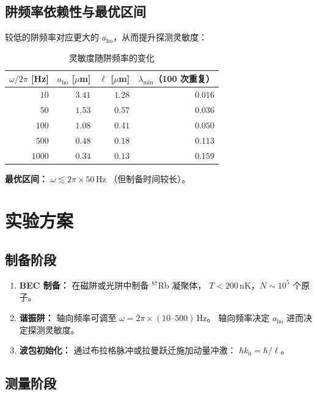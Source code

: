 \documentclass[a4paper,11pt]{article}
\begin{document}
\subsection{阱频率依赖性与最优区间}

较低的阱频率对应更大的 $a_{\mathrm{ho}}$，从而提升探测灵敏度：

\begin{table}[h]
\centering
\caption{灵敏度随阱频率的变化}
\begin{tabular}{rrrr}
\toprule
$\omega / 2\pi$ [Hz] & $a_{\mathrm{ho}}$ [$\mu$m] & $\ell$ [$\mu$m]
  & $\lambda_{\min}$（100 次重复） \\
\midrule
$10$   & $3{.}41$ & $1{.}28$ & $0{.}016$ \\
$50$   & $1{.}53$ & $0{.}57$ & $0{.}036$ \\
$100$  & $1{.}08$ & $0{.}41$ & $0{.}050$ \\
$500$  & $0{.}48$ & $0{.}18$ & $0{.}113$ \\
$1000$ & $0{.}34$ & $0{.}13$ & $0{.}159$ \\
\bottomrule
\end{tabular}
\end{table}

\textbf{最优区间：} $\omega \lesssim 2\pi \times 50\,\mathrm{Hz}$
（但制备时间较长）。

\section{实验方案}

\subsection{制备阶段}

\begin{enumerate}
  \item \textbf{BEC 制备：} 在磁阱或光阱中制备 $^{87}$Rb 凝聚体，
    $T < 200\,\mathrm{nK}$，$N \sim 10^5$ 个原子。
  \item \textbf{谐振阱：} 轴向频率可调至
    $\omega = 2\pi \times (10\text{--}500)\,\mathrm{Hz}$。
    轴向频率决定 $a_{\mathrm{ho}}$ 进而决定探测灵敏度。
  \item \textbf{波包初始化：} 通过布拉格脉冲或拉曼跃迁施加动量冲激：
    $\hbar k_0 = \hbar/\ell$。
\end{enumerate}

\subsection{测量阶段}
\end{document}
